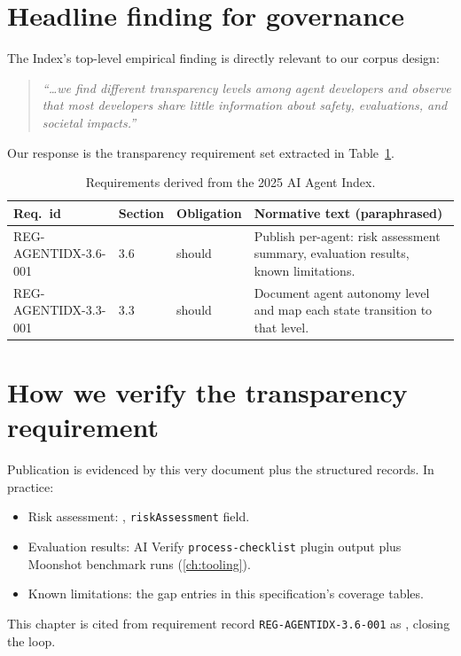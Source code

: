 \section{Headline finding for governance}

The Index's top-level empirical finding is directly relevant to our
corpus design:

\begin{quote}\small
\emph{``\ldots we find different transparency levels among agent developers
and observe that most developers share little information about safety,
evaluations, and societal impacts.''}
\end{quote}

Our response is the transparency requirement set extracted in Table~\ref{tab:agentidx-reqs}.

\begin{table}[h]
\centering
\small
\begin{tabularx}{\textwidth}{p{3.2cm}p{1.4cm}p{1.6cm}X}
\toprule
\textbf{Req.\ id} & \textbf{Section} & \textbf{Obligation} & \textbf{Normative text (paraphrased)} \\
\midrule
REG-AGENTIDX-3.6-001 & 3.6 & should & Publish per-agent: risk assessment summary, evaluation results, known limitations. \\
REG-AGENTIDX-3.3-001 & 3.3 & should & Document agent autonomy level and map each state transition to that level. \\
\bottomrule
\end{tabularx}
\caption{Requirements derived from the 2025 AI Agent Index.}
\label{tab:agentidx-reqs}
\end{table}

\section{How we verify the transparency requirement}

Publication is evidenced by this very document plus the structured
records. In practice:

\begin{itemize}
  \item Risk assessment: ,
        \texttt{riskAssessment} field.
  \item Evaluation results: AI Verify \texttt{process-checklist} plugin
        output plus Moonshot benchmark runs (\cref{ch:tooling}).
  \item Known limitations: the gap entries in this specification's
        coverage tables.
\end{itemize}

This chapter is cited from requirement record
\texttt{REG-AGENTIDX-3.6-001} as
, closing the
loop.
\clearpage

